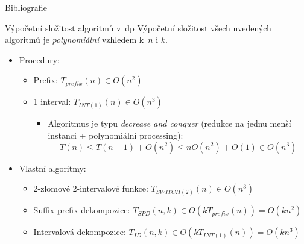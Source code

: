\documentclass{beamer}
\theoremstyle{remark}
\begin{document}
\begin{frame}[noframenumbering]{Bibliografie}



\end{frame}

\begin{frame}[noframenumbering]{Výpočetní složitost algoritmů v~\acrshort{dp}}
Výpočetní složitost všech uvedených algoritmů je \emph{polynomiální} vzhledem k~$n$ i $k$.

\begin{itemize}
\item Procedury:
\begin{itemize}
\item Prefix: $T_{prefix}(n) \in O(n^2)$
\item 1 interval: $T_{INT(1)}(n) \in O(n^3)$
\begin{itemize}
\item
Algoritmus je typu \emph{decrease and conquer} (redukce na jednu menší instanci + polynomiální processing):
$$T(n) \leq T(n-1) + O(n^2) \leq n O(n^2) + O(1) \in O(n^{3})$$
\end{itemize}
\end{itemize}
\item Vlastní algoritmy:
\begin{itemize}
\item 2-zlomové 2-intervalové funkce: $T_{SWITCH(2)}(n) \in O(n^3)$
\item Suffix-prefix dekompozice: $T_{SPD}(n, k) \in O(k T_{prefix}(n)) = O(kn^2)$
\item Intervalová dekompozice: $T_{ID}(n, k) \in O(k T_{INT(1)}(n)) = O(k n^3)$
\end{itemize}
\end{itemize}

\end{frame}

\end{document}

